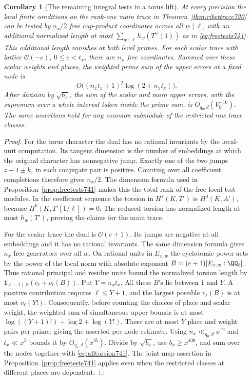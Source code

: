 \documentclass[a4paper,11pt]{article}
\newtheorem{corollary}[proposition]{Corollary}
\theoremstyle{definition}
\theoremstyle{remark}
\numberwithin{equation}{section}
\begin{document}
\begin{corollary}[The remaining integral tests in a torus lift]
\leavevmode\label{cor:torustests741}
At every precision the local finite conditions on the rank-one
main trace in Theorem~\ref{thm:ribettrace720} can be tested by
\(n_x/2\) free cup-product coordinates across all \(w\mid\ell\),
with an additional normalized length at most
\(\sum_{w\mid\ell}h_w(T^\vee(1))\) as in \eqref{eq:freetests741}.
This additional length vanishes at both level primes. For each
scalar trace with lattice \(\mathcal O(-e)\), \(0\le e<t_x\),
there are \(n_x\) free coordinates. Summed over these scalar
weights and places, the weighted prime sum of the upper errors
at a fixed node is
\[
       O\bigl((n_xt_x+1)^2\log(2+n_xt_x)\bigr).
\]
After division by \(\sqrt{b_x}\), the sum of the scalar and
main upper errors, with the supremum over a whole interval
taken inside the prime sum, is \(O_{q_0,d}(V_0^{-10})\).
The same assertions hold for any common submodule of the
restricted raw trace classes.
\end{corollary}
\begin{proof}
For the torus character the dual has no rational invariants by
the local-unit computation. Its tangent dimension is the number
of embeddings at which the original character has nonnegative
jump. Exactly one of the two jumps \(z-1\pm k_\tau\) in each
conjugate pair is positive. Counting over all coefficient
completions therefore gives \(n_x/2\). The dimension formula
used in Proposition~\ref{prop:freetests741} makes this the total
rank of the free local test modules. In the coefficient sequence
the torsion in \(H^1(K,T')\) is \(H^0(K,A')\), because
\(H^0(K,T'[1/\ell])=0\). The reduced torsion has normalized
length at most \(h_w(T')\), proving the claims for the main trace.

For the scalar trace the dual is \(\mathcal O(e+1)\). Its
jumps are negative at all embeddings and it has no rational
invariants. The same dimension formula gives \(n_x\) free
generators over all \(w\). On rational units in \(E_{x,w}\)
the cyclotomic power acts by the power of the local norm with
absolute exponent \(B=(e+1)[E_{x,w}:\QQ_\ell]\). Thus rational
principal and residue units bound the normalized torsion length
by \(\mathbf 1_{\ell-1\mid B}(c_\ell+v_\ell(B))\). Put
\(Y=n_xt_x\). All these \(B\)'s lie between \(1\) and \(Y\).
A positive contribution requires \(\ell\le Y+1\), and the
largest possible \(v_\ell(B)\) is at most \(v_\ell(Y!)\).
Consequently, before counting the choices of place and scalar
weight, the weighted sum of simultaneous upper bounds is at most
\(\log((Y+1)!)+\log2+\log(Y!)\).
There are at most \(Y\) place and weight pairs per prime,
giving the asserted per-node estimate. Using \(n_x\ll_{q_0,d}x^{12}\)
and \(t_x\ll x^5\) bounds it by \(O_{q_0,d}(x^{35})\).
Divide by \(\sqrt{b_x}\), use \(b_x\ge x^{400}\), and sum over
the nodes together with \eqref{eq:alltorsion741}. The joint-map
assertion in Proposition~\ref{prop:freetests741} applies even
when the restricted classes at different places are dependent.
\end{proof}
\end{document}
